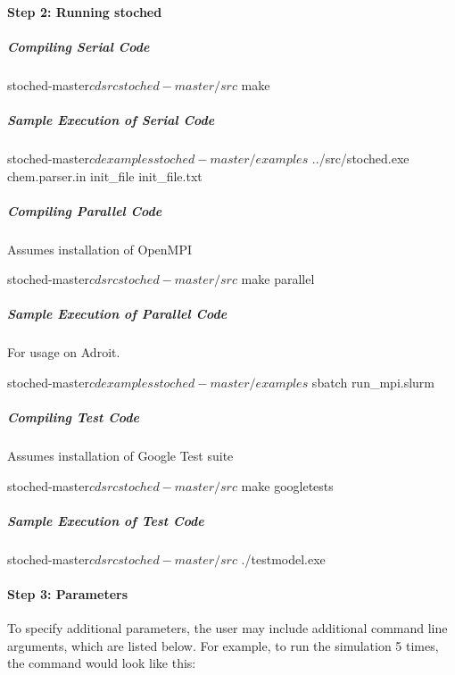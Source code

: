 \paragraph*{Step 2\+: Running stoched}

\subparagraph*{Compiling Serial Code}

\begin{DoxyVerb}stoched-master$ cd src
stoched-master/src$ make
\end{DoxyVerb}


\subparagraph*{Sample Execution of Serial Code}

\begin{DoxyVerb}stoched-master$ cd examples
stoched-master/examples$ ../src/stoched.exe chem.parser.in init_file init_file.txt
\end{DoxyVerb}


\subparagraph*{Compiling Parallel Code}

Assumes installation of Open\+M\+PI \begin{DoxyVerb}stoched-master$ cd src
stoched-master/src$ make parallel
\end{DoxyVerb}


\subparagraph*{Sample Execution of Parallel Code}

For usage on Adroit. \begin{DoxyVerb}stoched-master$ cd examples    
stoched-master/examples$ sbatch run_mpi.slurm
\end{DoxyVerb}


\subparagraph*{Compiling Test Code}

Assumes installation of Google Test suite \begin{DoxyVerb}stoched-master$ cd src
stoched-master/src$ make googletests
\end{DoxyVerb}


\subparagraph*{Sample Execution of Test Code}

\begin{DoxyVerb}stoched-master$ cd src
stoched-master/src$ ./testmodel.exe
\end{DoxyVerb}


\paragraph*{Step 3\+: Parameters}

To specify additional parameters, the user may include additional command line arguments, which are listed below. For example, to run the simulation 5 times, the command would look like this\+: 


